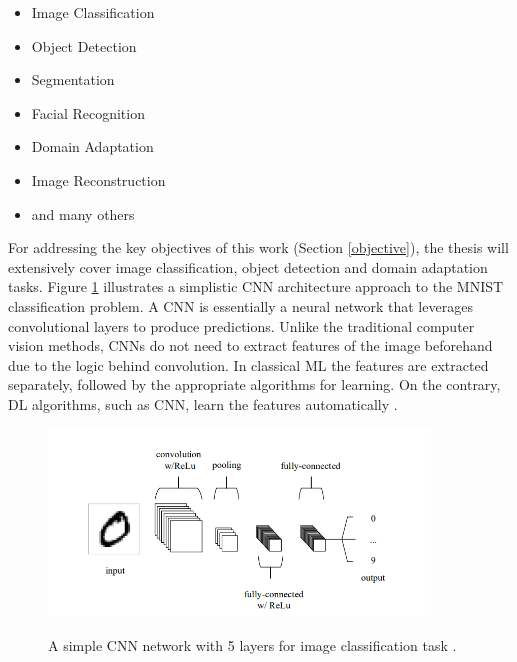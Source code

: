 \documentclass[english, 12pt, a4paper, elec, utf8, a-1b, online]{aaltothesis}
\begin{document}
\begin{itemize}
	\item Image Classification
	\item Object Detection
	\item Segmentation
	\item Facial Recognition
	\item Domain Adaptation
	\item Image Reconstruction
	\item and many others \cite{paperswithcode:2022}
\end{itemize}

For addressing the key objectives of this work (Section \ref{objective}), the thesis will extensively cover image classification, object detection and domain adaptation tasks. Figure \ref{CNN} illustrates a simplistic CNN architecture approach to the MNIST  \cite{lecun-mnisthandwrittendigit-2010} classification problem. A CNN is essentially a neural network that leverages convolutional layers to produce predictions. Unlike the traditional computer vision methods, CNNs do not need to extract features of the image beforehand due to the logic behind convolution. In classical ML the features are extracted separately, followed by the appropriate algorithms for learning. On the contrary, DL algorithms, such as CNN, learn the features automatically \cite{alom01}.


\begin{figure}[htb]
	\begin{center}
		\includegraphics[height=5cm]{./CNN.png}
	\end{center}
	\caption{A simple CNN network with 5 layers for image classification task \cite{Mahony2019}.}
	\begin{center}
		\label{CNN}
	\end{center}
\end{figure}
\FloatBarrier
\end{document}
